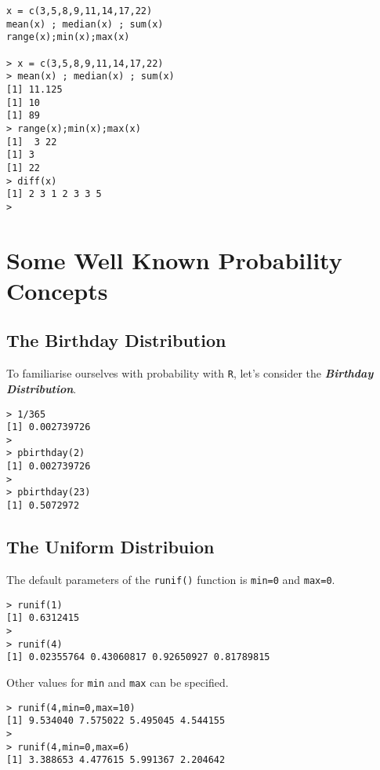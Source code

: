 \begin{framed}
\begin{verbatim}
x = c(3,5,8,9,11,14,17,22)
mean(x) ; median(x) ; sum(x)
range(x);min(x);max(x)

> x = c(3,5,8,9,11,14,17,22)
> mean(x) ; median(x) ; sum(x)
[1] 11.125
[1] 10
[1] 89
> range(x);min(x);max(x)
[1]  3 22
[1] 3
[1] 22
> diff(x)
[1] 2 3 1 2 3 3 5
> 
\end{verbatim}
\end{framed}



\section{Some Well Known Probability Concepts}
\subsection{The Birthday Distribution}
To familiarise ourselves with probability with \texttt{R}, let's consider the \textbf{\textit{Birthday Distribution}}.

\begin{framed}
\begin{verbatim}
> 1/365
[1] 0.002739726
>
> pbirthday(2)
[1] 0.002739726
>
> pbirthday(23)
[1] 0.5072972
\end{verbatim}
\end{framed}
\subsection{The Uniform Distribuion}
The default parameters of the \texttt{runif()} function is \texttt{min=0} and \texttt{max=0}.
\begin{framed}
\begin{verbatim}
> runif(1)
[1] 0.6312415
>
> runif(4)
[1] 0.02355764 0.43060817 0.92650927 0.81789815
\end{verbatim}
\end{framed}

Other values for \texttt{min} and \texttt{max} can be specified.
\begin{framed}
\begin{verbatim}
> runif(4,min=0,max=10)
[1] 9.534040 7.575022 5.495045 4.544155
>
> runif(4,min=0,max=6)
[1] 3.388653 4.477615 5.991367 2.204642
\end{verbatim}
\end{framed}
